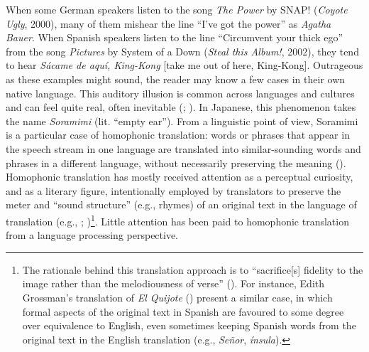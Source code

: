\documentclass[
]{article}
\begin{document}
When some German speakers listen to the song \emph{The Power} by SNAP!
(\emph{Coyote Ugly}, 2000), many of them mishear the line ``I've got the
power'' as \emph{Agatha Bauer}. When Spanish speakers listen to the line
``Circumvent your thick ego'' from the song \emph{Pictures} by System of
a Down (\emph{Steal this Album!}, 2002), they tend to hear \emph{Sácame
de aquí, King-Kong} {[}take me out of here, King-Kong{]}. Outrageous as
these examples might sound, the reader may know a few cases in their own
native language. This auditory illusion is common across languages and
cultures and can feel quite real, often inevitable
(;
). In
Japanese, this phenomenon takes the name \emph{Soramimi} (lit. ``empty
ear''). From a linguistic point of view, Soramimi is a particular case
of homophonic translation: words or phrases that appear in the speech
stream in one language are translated into similar-sounding words and
phrases in a different language, without necessarily preserving the
meaning (). Homophonic
translation has mostly received attention as a perceptual curiosity, and
as a literary figure, intentionally employed by translators to preserve
the meter and ``sound structure'' (e.g., rhymes) of an original text in
the language of translation (e.g.,
;
)\footnote{The
  rationale behind this translation approach is to ``sacrifice{[}s{]}
  fidelity to the image rather than the melodiousness of verse''
  (). For instance, Edith
  Grossman's translation of \emph{El Quijote}
  () present a
  similar case, in which formal aspects of the original text in Spanish
  are favoured to some degree over equivalence to English, even
  sometimes keeping Spanish words from the original text in the English
  translation (e.g., \emph{Señor}, \emph{ínsula}).}. Little attention
has been paid to homophonic translation from a language processing
perspective.
\end{document}
